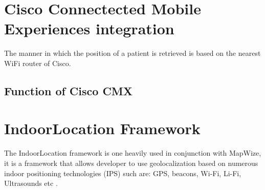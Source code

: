 \section{Cisco Connectected Mobile Experiences integration}
The manner in which the position of a patient is retrieved is based on the nearest WiFi router of Cisco.
\subsection{Function of Cisco CMX}
\section{IndoorLocation Framework}
The IndoorLocation framework is one heavily used in conjunction with MapWize, it is a framework that allows developer to use geolocalization based on numerous indoor positioning technologies (IPS) such are: GPS, beacons, Wi-Fi, Li-Fi, Ultrasounds etc \cite{IndoorLocation.io2019}.



